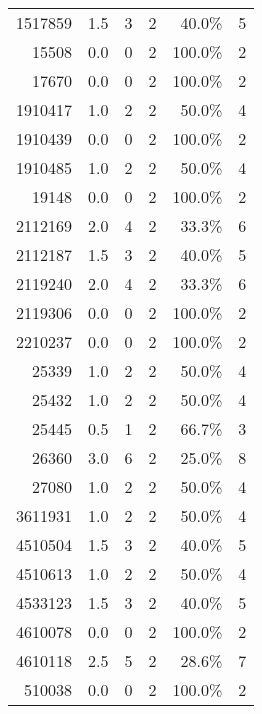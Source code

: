 \begin{longtable}{lrrrrr}
	\multicolumn{1}{r}{1517859} & 1.5   & 3     & 2     & 40.0\% & 5 \\
	\multicolumn{1}{r}{15508} & 0.0   & 0     & 2     & 100.0\% & 2 \\
	\multicolumn{1}{r}{17670} & 0.0   & 0     & 2     & 100.0\% & 2 \\
	\multicolumn{1}{r}{1910417} & 1.0   & 2     & 2     & 50.0\% & 4 \\
	\multicolumn{1}{r}{1910439} & 0.0   & 0     & 2     & 100.0\% & 2 \\
	\multicolumn{1}{r}{1910485} & 1.0   & 2     & 2     & 50.0\% & 4 \\
	\multicolumn{1}{r}{19148} & 0.0   & 0     & 2     & 100.0\% & 2 \\
	\multicolumn{1}{r}{2112169} & 2.0   & 4     & 2     & 33.3\% & 6 \\
	\multicolumn{1}{r}{2112187} & 1.5   & 3     & 2     & 40.0\% & 5 \\
	\multicolumn{1}{r}{2119240} & 2.0   & 4     & 2     & 33.3\% & 6 \\
	\multicolumn{1}{r}{2119306} & 0.0   & 0     & 2     & 100.0\% & 2 \\
	\multicolumn{1}{r}{2210237} & 0.0   & 0     & 2     & 100.0\% & 2 \\
	\multicolumn{1}{r}{25339} & 1.0   & 2     & 2     & 50.0\% & 4 \\
	\multicolumn{1}{r}{25432} & 1.0   & 2     & 2     & 50.0\% & 4 \\
	\multicolumn{1}{r}{25445} & 0.5   & 1     & 2     & 66.7\% & 3 \\
	\multicolumn{1}{r}{26360} & 3.0   & 6     & 2     & 25.0\% & 8 \\
	\multicolumn{1}{r}{27080} & 1.0   & 2     & 2     & 50.0\% & 4 \\
	\multicolumn{1}{r}{3611931} & 1.0   & 2     & 2     & 50.0\% & 4 \\
	\multicolumn{1}{r}{4510504} & 1.5   & 3     & 2     & 40.0\% & 5 \\
	\multicolumn{1}{r}{4510613} & 1.0   & 2     & 2     & 50.0\% & 4 \\
	\multicolumn{1}{r}{4533123} & 1.5   & 3     & 2     & 40.0\% & 5 \\
	\multicolumn{1}{r}{4610078} & 0.0   & 0     & 2     & 100.0\% & 2 \\
	\multicolumn{1}{r}{4610118} & 2.5   & 5     & 2     & 28.6\% & 7 \\
	\multicolumn{1}{r}{510038} & 0.0   & 0     & 2     & 100.0\% & 2 \\

\end{longtable}
